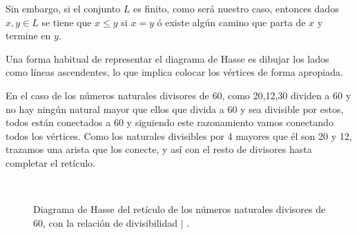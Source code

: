 \documentclass[oneside,openright,titlepage,numbers=noenddot,openany,headinclude,footinclude=true,
cleardoublepage=empty,abstractoff,BCOR=5mm,paper=a4,fontsize=12pt,main=spanish]{scrreprt}
\begin{document}
Sin embargo, si el conjunto $L$ es finito, como será nuestro caso, entonces dados $x,y \in L$ se tiene que $x\leq y$ si $x=y $ ó existe algún camino que parta de $x$ y termine en $y$.

Una forma habitual de representar el diagrama de Hasse es dibujar los lados como líneas ascendentes, lo que implica colocar los vértices de forma apropiada.

\begin{exampleth}En el caso de los números naturales divisores de 60, como 20,12,30 dividen a 60 y no hay ningún natural mayor que ellos que divida a 60 y sea divisible por estos, todos están conectados a 60 y siguiendo este razonamiento vamos conectando todos los vértices. Como los naturales divisibles por 4 mayores que él son 20 y 12, trazamos una arista que los conecte, y así con el resto de divisores hasta completar el retículo.

\label{divisors}  
\begin{figure}[h]
\centering
{}~
\caption{Diagrama de Hasse del retículo de los números naturales divisores de 60, con la relación de divisibilidad $|$ .}
\end{figure}

\end{exampleth}
\end{document}
